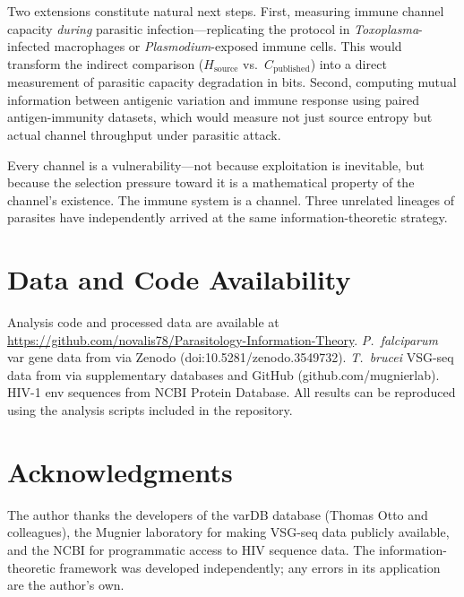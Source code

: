 \documentclass[twocolumn,10pt]{article}
\begin{document}
Two extensions constitute natural next steps.  First, measuring immune channel capacity \emph{during} parasitic infection---replicating the \citet{cheong2011} protocol in \textit{Toxoplasma}-infected macrophages or \textit{Plasmodium}-exposed immune cells.  This would transform the indirect comparison ($H_{\text{source}}$ vs.\ $C_{\text{published}}$) into a direct measurement of parasitic capacity degradation in bits.  Second, computing mutual information between antigenic variation and immune response using paired antigen-immunity datasets, which would measure not just source entropy but actual channel throughput under parasitic attack.

Every channel is a vulnerability---not because exploitation is inevitable, but because the selection pressure toward it is a mathematical property of the channel's existence.  The immune system is a channel.  Three unrelated lineages of parasites have independently arrived at the same information-theoretic strategy.

\section*{Data and Code Availability}

Analysis code and processed data are available at \url{https://github.com/novalis78/Parasitology-Information-Theory}.  \textit{P.~falciparum} var gene data from \citet{otto2019} via Zenodo (doi:10.5281/zenodo.3549732).  \textit{T.~brucei} VSG-seq data from \citet{mugnier2015} via supplementary databases and GitHub (github.com/mugnierlab).  HIV-1 env sequences from NCBI Protein Database.  All results can be reproduced using the analysis scripts included in the repository.

\section*{Acknowledgments}

The author thanks the developers of the varDB database (Thomas Otto and colleagues), the Mugnier laboratory for making VSG-seq data publicly available, and the NCBI for programmatic access to HIV sequence data.  The information-theoretic framework was developed independently; any errors in its application are the author's own.

{\small
\setlength{\bibsep}{2pt plus 0.5pt minus 0.5pt}

}
\end{document}
